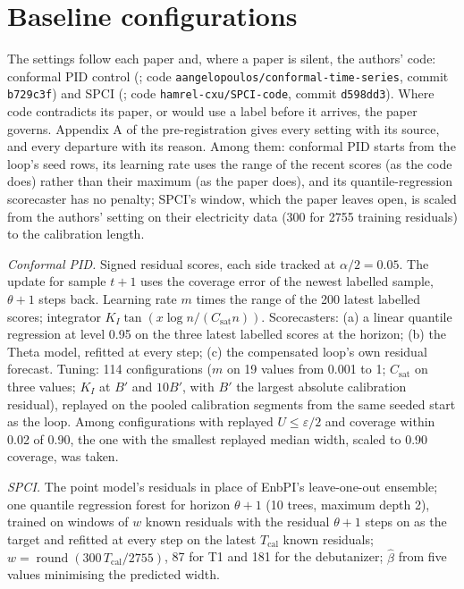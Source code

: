 \documentclass[10pt,a4paper]{article}
\begin{document}
\section{Baseline configurations}\label{sec:baselines}

The settings follow each paper and, where a paper is silent, the authors' code: conformal PID
control (\citealp{angelopoulos2023pids}; code \texttt{aangelopoulos/conformal-time-series}, commit
\texttt{b729c3f}) and SPCI (\citealp{xu2023spcis}; code \texttt{hamrel-cxu/SPCI-code}, commit
\texttt{d598dd3}). Where code contradicts its paper, or would use a label before it arrives, the
paper governs. Appendix A of the pre-registration gives every setting with its source, and every
departure with its reason. Among them: conformal PID starts from the loop's seed rows, its
learning rate uses the range of the recent scores (as the code does) rather than their maximum
(as the paper does), and its quantile-regression scorecaster has no penalty; SPCI's window, which
the paper leaves open, is scaled from the authors' setting on their electricity data (300 for
2755 training residuals) to the calibration length.

\emph{Conformal PID.} Signed residual scores, each side tracked at $\alpha/2 = 0.05$. The update
for sample $t+1$ uses the coverage error of the newest labelled sample, $\theta + 1$ steps back.
Learning rate $m$ times the range of the 200 latest labelled scores; integrator
$K_I \tan(x \log n /(C_{\mathrm{sat}} n))$. Scorecasters: (a) a linear quantile regression at level
0.95 on the three latest labelled scores at the horizon; (b) the Theta model, refitted at every
step; (c) the compensated loop's own residual forecast. Tuning: 114 configurations ($m$ on 19
values from 0.001 to 1; $C_{\mathrm{sat}}$ on three values; $K_I$ at $B'$ and $10B'$, with $B'$ the
largest absolute calibration residual), replayed on the pooled calibration segments from the same
seeded start as the loop. Among configurations with replayed $U \le \varepsilon/2$ and coverage
within 0.02 of 0.90, the one with the smallest replayed median width, scaled to 0.90 coverage, was
taken.

\emph{SPCI.} The point model's residuals in place of EnbPI's leave-one-out ensemble; one quantile
regression forest for horizon $\theta + 1$ (10 trees, maximum depth 2), trained on windows of
$w$ known residuals with the residual $\theta + 1$ steps on as the target and refitted at every
step on the latest $T_{\mathrm{cal}}$ known residuals; $w = \operatorname{round}(300\,T_{\mathrm{cal}}
/2755)$, 87 for T1 and 181 for the debutanizer; $\hat\beta$ from five values minimising the
predicted width.
\end{document}
